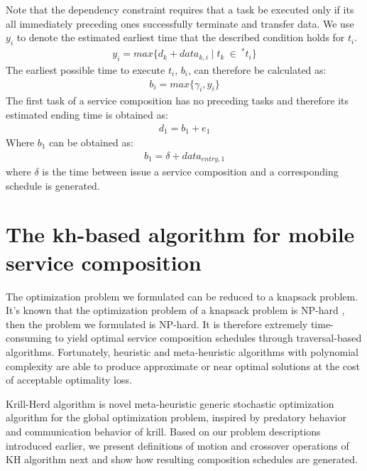 \documentclass[journal]{IEEEtran}
\begin{document}
Note that the dependency constraint requires that a task be executed only if its all immediately preceding ones successfully terminate and transfer data. We use $y_i$ to denote the estimated earliest time that the described condition holds for $t_i$.
\begin{align}
y_i = max \{d_k + data_{k,i} \mid t_k \ \in \ ^{*}t_i \} 
\end{align}
The earliest possible time to execute $t_i$, $b_i$, can therefore be calculated as:
\begin{align}
b_i = max \{ \gamma_i, y_i \}
\end{align}
The first task of a service composition has no preceding tasks and therefore its estimated ending time is obtained as:
\begin{align}
d_1 = b_1 + e_1
\end{align}
Where $b_1$ can be obtained as:
\begin{align}
b_1 = \delta + data_{entry, 1}
\end{align}
where $\delta$ is the time between issue a service composition and a corresponding schedule is generated.




\section{The kh-based algorithm for mobile service composition}

The optimization problem we formulated can be reduced to a knapsack problem. It's known that the optimization problem of a knapsack problem is NP-hard \cite{papadimitriou1998combinatorial}, then the problem we formulated is NP-hard. It is therefore extremely time-consuming to yield optimal service composition schedules through traversal-based algorithms. Fortunately, heuristic and meta-heuristic algorithms with polynomial complexity are able to produce approximate or near optimal solutions at the cost of acceptable optimality loss.

Krill-Herd algorithm \cite{gandomi2012krill} is novel meta-heuristic generic stochastic optimization algorithm for the global optimization problem, inspired by predatory behavior and communication behavior of krill. 
Based on our problem descriptions introduced earlier, we present definitions of motion and crossover operations of KH algorithm next and show how resulting composition schedules are generated.
\end{document}
